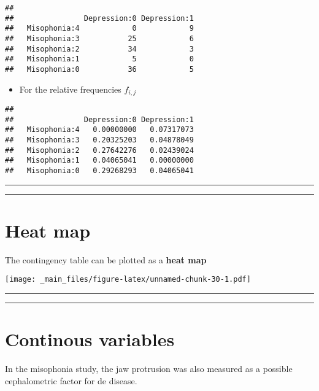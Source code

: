 \documentclass[
]{book}
\providecommand{\tightlist}{%
  \setlength{\itemsep}{0pt}\setlength{\parskip}{0pt}}
\begin{document}
\begin{verbatim}
##               
##                Depression:0 Depression:1
##   Misophonia:4            0            9
##   Misophonia:3           25            6
##   Misophonia:2           34            3
##   Misophonia:1            5            0
##   Misophonia:0           36            5
\end{verbatim}

\begin{itemize}
\tightlist
\item
  For the relative frequencies \(f_{i,j}\)
\end{itemize}

\begin{verbatim}
##               
##                Depression:0 Depression:1
##   Misophonia:4   0.00000000   0.07317073
##   Misophonia:3   0.20325203   0.04878049
##   Misophonia:2   0.27642276   0.02439024
##   Misophonia:1   0.04065041   0.00000000
##   Misophonia:0   0.29268293   0.04065041
\end{verbatim}

\begin{center}\rule{0.5\linewidth}{0.5pt}\end{center}

\begin{center}\rule{0.5\linewidth}{0.5pt}\end{center}

\hypertarget{heat-map}{%
\section{Heat map}\label{heat-map}}

The contingency table can be plotted as a \textbf{heat map}

\texttt{[image: \_main\_files/figure-latex/unnamed-chunk-30-1.pdf]}

\begin{center}\rule{0.5\linewidth}{0.5pt}\end{center}

\begin{center}\rule{0.5\linewidth}{0.5pt}\end{center}

\hypertarget{continous-variables}{%
\section{Continous variables}\label{continous-variables}}

In the misophonia study, the jaw protrusion was also measured as a possible cephalometric factor for de disease.
\end{document}
